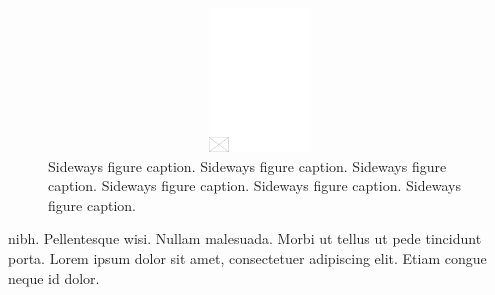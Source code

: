 \documentclass[AMS,STIX2COL]{WileyNJD-v2}
\begin{document}
    \begin{figure}
        \centerline{\includegraphics[width=542pt,height=9pc,draft]{empty}}
        \caption{Sideways figure caption. Sideways figure caption. Sideways figure caption. Sideways figure caption. Sideways figure caption. Sideways figure caption.\label{fig3}}
    \end{figure}

    nibh. Pellentesque wisi. Nullam malesuada. Morbi ut tellus ut pede tincidunt porta. Lorem ipsum dolor sit amet,
    consectetuer adipiscing elit. Etiam congue neque id dolor.
\end{document}
